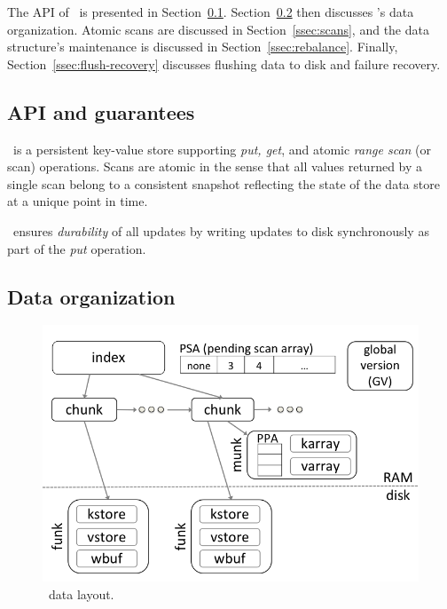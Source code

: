 

The API of \sys\ is presented in Section~\ref{ssec:api}. 
Section~\ref{ssec:layout} then discusses \sys's data organization. 
Atomic scans are discussed in Section~\ref{ssec:scans}, and 
the data structure's maintenance is discussed in Section~\ref{ssec:rebalance}.
Finally, Section~\ref{ssec:flush-recovery} discusses flushing data to disk and failure recovery.


\subsection{API and guarantees}
\label{ssec:api}

\sys\ is a persistent key-value store supporting \emph{put, get}, and atomic \emph{range scan} (or scan) operations. 
Scans are atomic in the sense that all values returned by a single scan belong to a consistent snapshot reflecting
the state of the data store at a unique point in time.


\sys\ ensures \emph{durability} of all updates by writing updates to disk synchronously as part of the \emph{put} operation.

\subsection{Data organization}
\label{ssec:layout}

\begin{figure}[htb]
\centerline{
\includegraphics[width=0.9\columnwidth]{PiWi.png}
}
\caption{\sys\ data layout.}
\label{fig:layout}
\end{figure}

